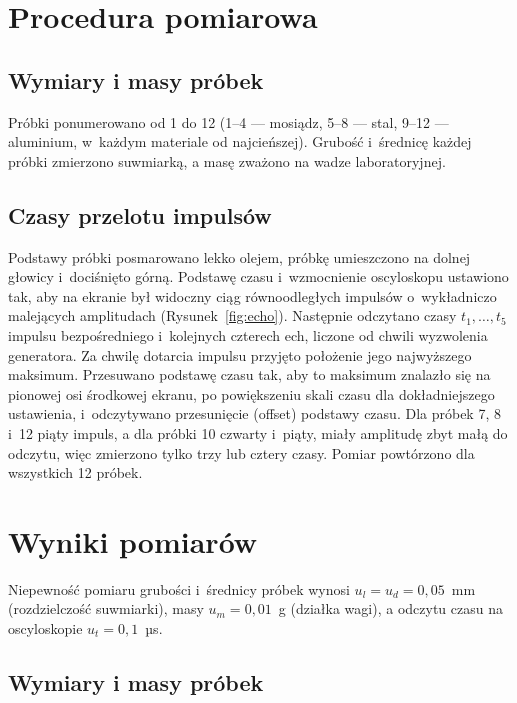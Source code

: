 \documentclass[12pt, a4paper]{article}
\begin{document}
\section{Procedura pomiarowa}

\subsection{Wymiary i masy próbek}

Próbki ponumerowano od 1 do 12 (1--4 --- mosiądz, 5--8 --- stal, 9--12 --- aluminium,
w~każdym materiale od najcieńszej). Grubość i~średnicę każdej próbki zmierzono suwmiarką,
a masę zważono na wadze laboratoryjnej.

\subsection{Czasy przelotu impulsów}

Podstawy próbki posmarowano lekko olejem, próbkę umieszczono na dolnej głowicy i~dociśnięto
górną. Podstawę czasu i~wzmocnienie oscyloskopu ustawiono tak, aby na ekranie był widoczny
ciąg równoodległych impulsów o~wykładniczo malejących amplitudach (Rysunek~\ref{fig:echo}).
Następnie odczytano czasy $t_1, \dots, t_5$ impulsu bezpośredniego i~kolejnych czterech ech,
liczone od chwili wyzwolenia generatora. Za chwilę dotarcia impulsu przyjęto położenie jego
najwyższego maksimum. Przesuwano podstawę czasu tak, aby to maksimum znalazło się na
pionowej osi środkowej ekranu, po powiększeniu skali czasu dla dokładniejszego ustawienia,
i~odczytywano przesunięcie (offset) podstawy czasu.
Dla próbek 7, 8 i~12 piąty impuls, a dla próbki 10 czwarty i~piąty, miały amplitudę zbyt
małą do odczytu, więc zmierzono tylko trzy lub cztery czasy. Pomiar powtórzono dla
wszystkich 12 próbek.

\section{Wyniki pomiarów}

Niepewność pomiaru grubości i~średnicy próbek wynosi $u_l = u_d = 0{,}05$~mm (rozdzielczość suwmiarki),
masy $u_m = 0{,}01$~g (działka wagi), a odczytu czasu na oscyloskopie $u_t = 0{,}1$~µs.

\subsection{Wymiary i masy próbek}
\end{document}

